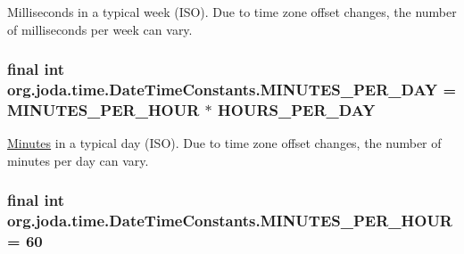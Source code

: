 Milliseconds in a typical week (I\-S\-O). Due to time zone offset changes, the number of milliseconds per week can vary. \hypertarget{classorg_1_1joda_1_1time_1_1_date_time_constants_a522a434d1fac486c8cd834d56bfe886b}{
\subsubsection[{M\-I\-N\-U\-T\-E\-S\-\_\-\-P\-E\-R\-\_\-\-D\-A\-Y}]{\setlength{\rightskip}{0pt plus 5cm}final int org.\-joda.\-time.\-Date\-Time\-Constants.\-M\-I\-N\-U\-T\-E\-S\-\_\-\-P\-E\-R\-\_\-\-D\-A\-Y = {\bf M\-I\-N\-U\-T\-E\-S\-\_\-\-P\-E\-R\-\_\-\-H\-O\-U\-R} $\ast$ {\bf H\-O\-U\-R\-S\-\_\-\-P\-E\-R\-\_\-\-D\-A\-Y}\hspace{0.3cm}{\ttfamily [static]}}}\label{classorg_1_1joda_1_1time_1_1_date_time_constants_a522a434d1fac486c8cd834d56bfe886b}
\hyperlink{classorg_1_1joda_1_1time_1_1_minutes}{Minutes} in a typical day (I\-S\-O). Due to time zone offset changes, the number of minutes per day can vary. \hypertarget{classorg_1_1joda_1_1time_1_1_date_time_constants_a4c312d2b4f88dc10b020fff9529814eb}{
\subsubsection[{M\-I\-N\-U\-T\-E\-S\-\_\-\-P\-E\-R\-\_\-\-H\-O\-U\-R}]{\setlength{\rightskip}{0pt plus 5cm}final int org.\-joda.\-time.\-Date\-Time\-Constants.\-M\-I\-N\-U\-T\-E\-S\-\_\-\-P\-E\-R\-\_\-\-H\-O\-U\-R = 60\hspace{0.3cm}{\ttfamily [static]}}}\label{classorg_1_1joda_1_1time_1_1_date_time_constants_a4c312d2b4f88dc10b020fff9529814eb}
